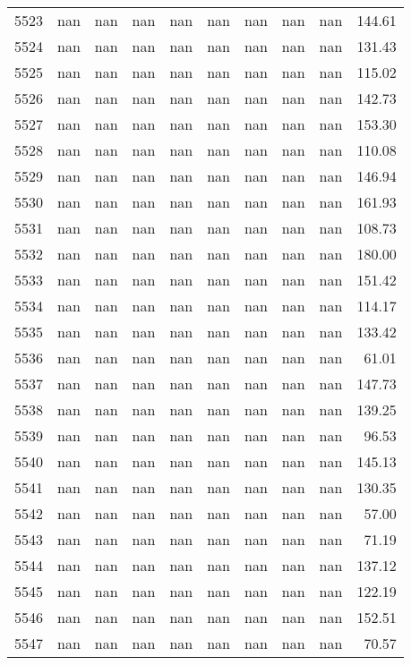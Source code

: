 \begin{tabular}{lrrrrrrrrr}
5523 & nan & nan & nan & nan & nan & nan & nan & nan & 144.61 \\
5524 & nan & nan & nan & nan & nan & nan & nan & nan & 131.43 \\
5525 & nan & nan & nan & nan & nan & nan & nan & nan & 115.02 \\
5526 & nan & nan & nan & nan & nan & nan & nan & nan & 142.73 \\
5527 & nan & nan & nan & nan & nan & nan & nan & nan & 153.30 \\
5528 & nan & nan & nan & nan & nan & nan & nan & nan & 110.08 \\
5529 & nan & nan & nan & nan & nan & nan & nan & nan & 146.94 \\
5530 & nan & nan & nan & nan & nan & nan & nan & nan & 161.93 \\
5531 & nan & nan & nan & nan & nan & nan & nan & nan & 108.73 \\
5532 & nan & nan & nan & nan & nan & nan & nan & nan & 180.00 \\
5533 & nan & nan & nan & nan & nan & nan & nan & nan & 151.42 \\
5534 & nan & nan & nan & nan & nan & nan & nan & nan & 114.17 \\
5535 & nan & nan & nan & nan & nan & nan & nan & nan & 133.42 \\
5536 & nan & nan & nan & nan & nan & nan & nan & nan & 61.01 \\
5537 & nan & nan & nan & nan & nan & nan & nan & nan & 147.73 \\
5538 & nan & nan & nan & nan & nan & nan & nan & nan & 139.25 \\
5539 & nan & nan & nan & nan & nan & nan & nan & nan & 96.53 \\
5540 & nan & nan & nan & nan & nan & nan & nan & nan & 145.13 \\
5541 & nan & nan & nan & nan & nan & nan & nan & nan & 130.35 \\
5542 & nan & nan & nan & nan & nan & nan & nan & nan & 57.00 \\
5543 & nan & nan & nan & nan & nan & nan & nan & nan & 71.19 \\
5544 & nan & nan & nan & nan & nan & nan & nan & nan & 137.12 \\
5545 & nan & nan & nan & nan & nan & nan & nan & nan & 122.19 \\
5546 & nan & nan & nan & nan & nan & nan & nan & nan & 152.51 \\
5547 & nan & nan & nan & nan & nan & nan & nan & nan & 70.57 \\

\end{tabular}
